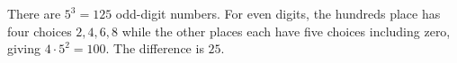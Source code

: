 There are $5^3=125$ odd-digit numbers. For even digits, the hundreds place has four choices $2,4,6,8$ while the other places each have five choices including zero, giving $4\cdot5^2=100$. The difference is $\boxed{25}$.
